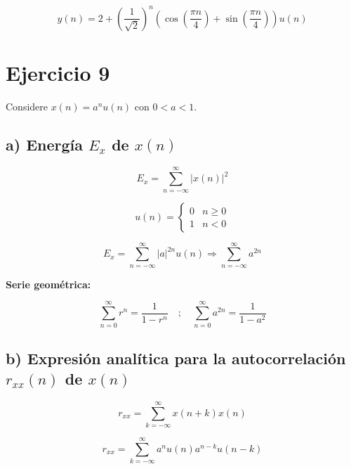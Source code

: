 \documentclass[12pt,a4paper]{article}
\begin{document}
\begin{equation}
\boxed{y(n) = 2 + \left(\frac{1}{\sqrt{2}}\right)^n \left(\cos\left(\frac{\pi n}{4}\right) + \sin\left(\frac{\pi n}{4}\right)\right) u(n)}
\end{equation}


\section*{Ejercicio 9}

Considere $x(n) = a^n u(n)$ con $0 < a < 1$.

\subsection*{a) Energía $E_x$ de $x(n)$}

\begin{equation}
E_x = \sum_{n=-\infty}^{\infty} |x(n)|^2 
\end{equation}

\begin{equation}
u(n) = \begin{cases}
0 & n \geq 0 \\
1 & n < 0
\end{cases}
\end{equation}

\begin{equation}
E_x = \sum_{n=-\infty}^{\infty} |a|^{2n} u(n) \Rightarrow  \sum_{n=-\infty}^{\infty} a^{2n}
\end{equation}

\textbf{Serie geométrica:}

\begin{equation}
\sum_{n=0}^{\infty} r^n = \frac{1}{1 - r^n} \quad ; \quad \sum_{n=0}^{\infty} a^{2n} = \boxed{\frac{1}{1-a^2}}
\end{equation}

\subsection*{b) Expresión analítica para la autocorrelación $r_{xx}(n)$ de $x(n)$}

\begin{equation}
r_{xx} = \sum_{k=-\infty}^{\infty} x(n+k) x(n)
\end{equation}

\begin{equation}
r_{xx} = \sum_{k=-\infty}^{\infty} a^n u(n) a^{n-k} u(n-k)
\end{equation}
\end{document}
